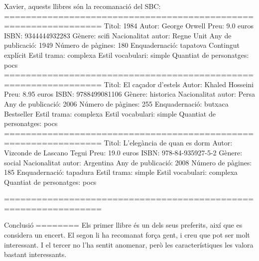 Xavier, 
aquests llibres són la recomanació del SBC: 
================================================================
Titol:                   1984
Autor:                   George Orwell
Preu:                    9.0 euros
ISBN:                    9344444932283
Gènere:                  scifi
Nacionalitat autor:      Regne Unit
Any de publicació:       1949
Número de pàgines:       180
Enquadernació:           tapatova
Contingut explícit
Estil trama:             complexa
Estil vocabulari:        simple
Quantiat de personatges: pocs
================================================================
Titol:                   El caçador d'estels
Autor:                   Khaled Hosseini
Preu:                    8.95 euros
ISBN:                    9788499081106
Gènere:                  historica
Nacionalitat autor:      Persa
Any de publicació:       2006
Número de pàgines:       255
Enquadernació:           butxaca
Bestseller
Estil trama:             complexa
Estil vocabulari:        simple
Quantiat de personatges: pocs
================================================================
Titol:                   L'elegància de quan es dorm
Autor:                   Vizconde de Lascano Tegui
Preu:                    19.0 euros
ISBN:                    978-84-935927-5-2
Gènere:                  social
Nacionalitat autor:      Argentina
Any de publicació:       2008
Número de pàgines:       185
Enquadernació:           tapadura
Estil trama:             simple
Estil vocabulari:        complexa
Quantiat de personatges: pocs

================================================================

Conclusió
========
Els primer llibre és un dels seus preferits, així que es considera un encert. El segon li ha recomanat força gent, i creu que pot ser molt interessant. I el tercer no l'ha sentit anomenar, però les característiques les valora bastant interessants.